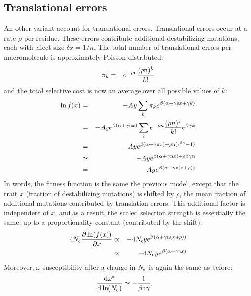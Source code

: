 \documentclass{article}
\begin{document}
\subsection{Translational errors}
An other variant account for translational errors. Translational errors occur at a rate $\rho$ per residue. These errors contribute additional destabilizing mutations, each with effect size $\delta x = 1/n$. The total number of translational errors per macromolecule is approximately Poisson distributed:
\begin{eqnarray}
\pi_k &=& e^{-\rho \text{n}} \frac{(\rho \text{n})^k}{k!}
\end{eqnarray}
and the total selective cost is now an average over all possible values of $k$:
\begin{eqnarray}
\ln f(x) &=& - A y \sum_k \pi_k e^{\beta(\alpha + \gamma\text{n} x + \gamma k)}
\\
&=& - A y  e^{\beta(\alpha + \gamma\text{n} x)} \sum_k e^{-\rho n} \frac{(\rho n)^k}{k!} e^{\beta \gamma k}
\\
&=& - A y  e^{\beta(\alpha + \gamma\text{n} x) + \rho \text{n} (e^{\beta \gamma} -1 )}
\\
& \simeq & - A y  e^{\beta(\alpha + \gamma\text{n} x) + \rho \beta \gamma \text{n}}
\\
& =& - A y  e^{\beta(\alpha + \gamma \text{n} (x + \rho))}
\end{eqnarray}
In words, the fitness function is the same the previous model, except that the trait $x$ (fraction of destabilizing mutations) is shifted by $\rho$, the mean fraction of additional mutations contributed by translation errors. This additional factor is independent of $x$, and as a result, the scaled selection strength is essentially the same, up to a proportionality constant (contributed by the shift):
\begin{eqnarray}
4 N_{\mathrm{e}} \frac{\partial \ln (f(x))}{\partial x} &\propto& -4 N_{\mathrm{e}} y e^{\beta(\alpha + \gamma \text{n} (x + \rho))}
\\ &\propto& -4 N_{\mathrm{e}} y e^{\beta(\alpha + \gamma\text{n} x)}
\end{eqnarray}
Moreover, $\omega$ susceptibility after a change in $N_{\mathrm{e}}$ is again the same as before:
\begin{align}
\frac{ \mathrm{d} \omega^{*}}{\mathrm{d} \ln (N_{\mathrm{e}})} & \simeq - \frac{1}{\beta \text{n} \gamma}.
\end{align}
\end{document}

